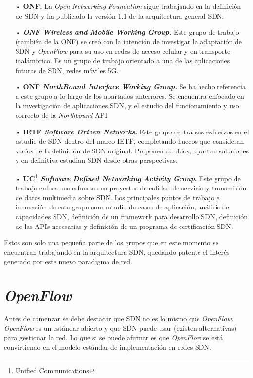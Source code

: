 \documentclass[a4paper,11pt]{book}
\begin{document}
\begin{itemize}
\item[•] \textbf{\ac{ONF}.} La \textit{Open Networking Foundation} sigue trabajando en la definición de \ac{SDN} y ha publicado la versión 1.1 de la arquitectura general \ac{SDN}\cite{SDN11}\nocite{SDN11}.
\item[•] \textbf{\textit{\ac{ONF} Wireless and Mobile Working Group.}} Este grupo de trabajo (también de la \ac{ONF}) se creó con la intención de investigar la adaptación de \ac{SDN} y \emph{OpenFlow} para su uso en redes de acceso celular y en transporte inalámbrico. Es un grupo de trabajo orientado a una de las aplicaciones futuras de \ac{SDN}, redes móviles 5G.
\item[•] \textbf{\ac{ONF} \textit{NorthBound Interface Working Group.}} Se ha hecho referencia a este grupo a lo largo de los apartados anteriores. Se encuentra enfocado en la investigación de aplicaciones \ac{SDN}, y el estudio del funcionamiento y uso correcto de la \textit{Northbound} \ac{API}.
\item[•] \textbf{\ac{IETF} \textit{Software Driven Networks}.} Este grupo centra sus esfuerzos en el estudio de \ac{SDN} dentro del marco \ac{IETF}, completando huecos que consideran vacíos de la definición de \ac{SDN} original. Proponen cambios, aportan soluciones y en definitiva estudian \ac{SDN} desde otras perspectivas.
\item[•] \textbf{UC\footnote{Unified Communications}\textit{ Software Defined Networking Activity Group}.} Este grupo de trabajo enfoca sus esfuerzos en proyectos de calidad de servicio y transmisión de datos multimedia sobre \ac{SDN}. Los principales puntos de trabajo e innovación de este grupo son: estudio de casos de aplicación, análisis de capacidades \ac{SDN}, definición de un framework para desarrollo \ac{SDN}, definición de las \ac{API}s necesarias y definición de un programa de certificación \ac{SDN}.
\end{itemize}

Estos son solo una pequeña parte de los grupos que en este momento se encuentran trabajando en la arquitectura \ac{SDN}, quedando patente el interés generado por este nuevo paradigma de red.



\section{\emph{OpenFlow}}\label{openFlow}
Antes de comenzar se debe destacar que \ac{SDN} no es lo mismo que \emph{OpenFlow}. \emph{OpenFlow} es un estándar abierto y que \ac{SDN} puede usar (existen alternativas) para gestionar la red. Lo que si se puede afirmar es que \emph{OpenFlow} se está convirtiendo en el modelo estándar de implementación en redes \ac{SDN}.
\end{document}

